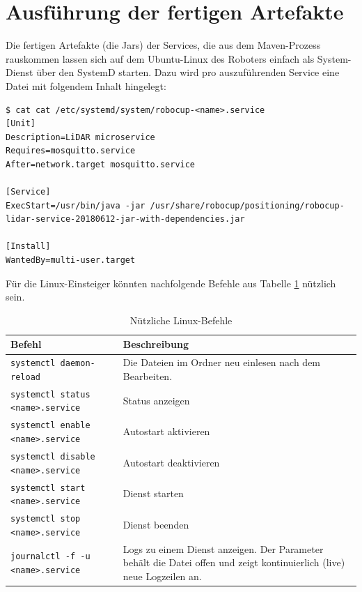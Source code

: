\section{Ausführung der fertigen Artefakte}
Die fertigen Artefakte (die Jars) der Services, die aus dem Maven-Prozess rauskommen lassen sich auf dem Ubuntu-Linux des Roboters einfach als System-Dienst über den SystemD starten. Dazu wird pro auszuführenden Service eine Datei mit folgendem Inhalt hingelegt:
\begin{lstlisting}
$ cat cat /etc/systemd/system/robocup-<name>.service 
[Unit]
Description=LiDAR microservice
Requires=mosquitto.service
After=network.target mosquitto.service

[Service]
ExecStart=/usr/bin/java -jar /usr/share/robocup/positioning/robocup-lidar-service-20180612-jar-with-dependencies.jar

[Install]
WantedBy=multi-user.target
\end{lstlisting}

Für die Linux-Einsteiger könnten nachfolgende Befehle aus Tabelle \ref{tab:linuxCommands} nützlich sein.
\begin{table}[H]
	\centering
	\begin{tabular}{p{7cm}p{8cm}} \toprule
	\textbf{Befehl}					& \textbf{Beschreibung}						\\ \midrule
	\texttt{systemctl daemon-reload}		& Die Dateien im Ordner \ctexttt{/etc/systemd/system/..} neu einlesen nach dem Bearbeiten.\\ \midrule
	\texttt{systemctl status <name>.service}	& Status anzeigen						\\ \midrule
	\texttt{systemctl enable <name>.service} 	& Autostart aktivieren						\\ \midrule
	\texttt{systemctl disable <name>.service} 	& Autostart deaktivieren					\\ \midrule
	\texttt{systemctl start <name>.service} 	& Dienst starten						\\ \midrule
	\texttt{systemctl stop <name>.service} 		& Dienst beenden						\\ \midrule
	\texttt{journalctl -f -u <name>.service} 	& Logs zu einem Dienst anzeigen. Der Parameter \ctexttt{-f} behält die Datei offen und zeigt kontinuierlich (live) neue Logzeilen an.\\ \bottomrule
	\end{tabular}
	\caption{Nützliche Linux-Befehle}
	\label{tab:linuxCommands}
\end{table}
